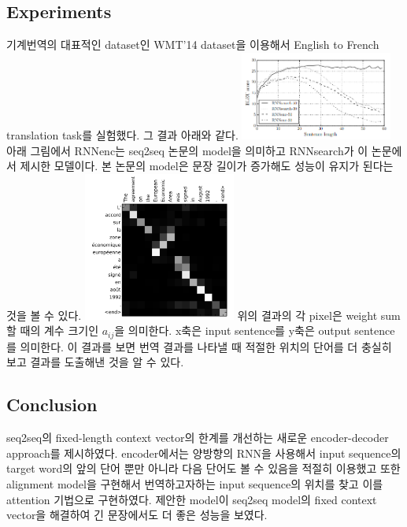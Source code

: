 \documentclass[extendedabs]{bmvc2k}
\begin{document}
 \subsection{Experiments}
 \quad 기계번역의 대표적인 dataset인  WMT'14 dataset을 이용해서 English to French translation task를 실험했다. 그 결과 아래와 같다.
 \newline  \includegraphics[width=5cm]{images/03_attention.PNG}
 \newline 아래 그림에서 RNNenc는 seq2seq 논문의 model을 의미하고 RNNsearch가 이 논문에서 제시한 모델이다. 본 논문의 model은 문장 길이가 증가해도 성능이 유지가 된다는 것을 볼 수 있다.
 \newline  \includegraphics[width=5cm]{images/04_attention.PNG} 
 \newline 위의 결과의 각 pixel은 weight sum 할 때의 계수 크기인 $a_{ij}$을 의미한다. x축은 input sentence를 y축은 output sentence를 의미한다. 이 결과를 보면 번역 결과를 나타낼 때 적절한 
 위치의 단어를 더 충실히 보고 결과를 도출해낸 것을 알 수 있다.
 
 \subsection{Conclusion}
 \quad seq2seq의 fixed-length context vector의 한계를 개선하는 새로운 encoder-decoder approach를 제시하였다. encoder에서는 양방향의 RNN을 사용해서 input sequence의 target word의
 앞의 단어 뿐만 아니라 다음 단어도 볼 수 있음을 적절히 이용했고 또한 alignment model을 구현해서 번역하고자하는 input sequence의 위치를 찾고 이를 attention 기법으로 구현하였다. 
 제안한 model이 seq2seq model의 fixed context vector을 해결하여 긴 문장에서도 더 좋은 성능을 보였다.


\newpage

\end{document}

